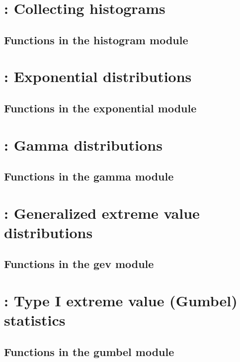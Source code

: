 \documentclass[10pt]{book}
\begin{document}
\newpage
\section{: Collecting histograms}

\subsection{Functions in the histogram module}


\newpage
\section{: Exponential distributions}

\subsection{Functions in the exponential module}


\newpage
\section{: Gamma distributions}

\subsection{Functions in the gamma module}


\newpage
\section{: Generalized extreme value distributions}

\subsection{Functions in the gev module}


\newpage
\section{: Type I extreme value (Gumbel) statistics}

\subsection{Functions in the gumbel module}

\end{document}

